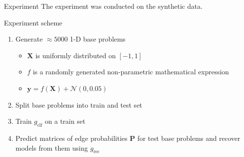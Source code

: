 \documentclass{beamer}
\begin{document}
\begin{frame}{Experiment}
The experiment was conducted on the synthetic data.
\begin{block}{Experiment scheme}
	\begin{enumerate}
		\item Generate $\approx 5000$ 1-D base problems
		\begin{itemize}
			\item $\mathbf{X}$ is uniformly distributed on $[-1, 1]$
			\item $f$ is a randomly generated non-parametric mathematical expression
			\item $\mathbf{y} = f(\mathbf{X}) + \mathcal{N}(0, 0.05)$
		\end{itemize}
		\item Split base problems into train and test set
		\item Train $g_{\text{clf}}$ on a train set
		\item Predict matrices of edge probabilities $\mathbf{P}$ for test base problems and recover models from them using $g_{\text{rec}}$
	\end{enumerate}
\end{block}
\end{frame}
\end{document}
